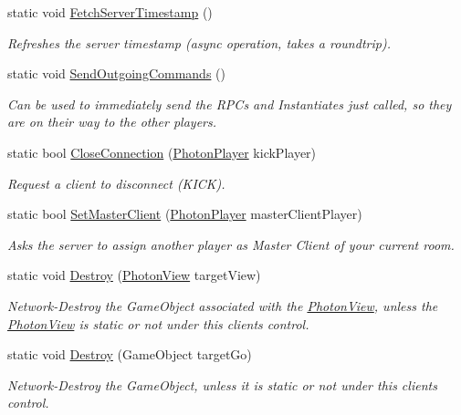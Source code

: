 \begin{DoxyCompactItemize}
static void \hyperlink{class_photon_network_a88ef2952a1d0a468d5ba2bff48fa084c}{Fetch\+Server\+Timestamp} ()
\begin{DoxyCompactList}\small\item\em Refreshes the server timestamp (async operation, takes a roundtrip). \end{DoxyCompactList}\item 
static void \hyperlink{class_photon_network_a3b8d0c1cefdf577e1dff8aecb147b7fd}{Send\+Outgoing\+Commands} ()
\begin{DoxyCompactList}\small\item\em Can be used to immediately send the R\+P\+Cs and Instantiates just called, so they are on their way to the other players. \end{DoxyCompactList}\item 
static bool \hyperlink{class_photon_network_a9cc8da229d513fce2fddbc5e2c6eaed2}{Close\+Connection} (\hyperlink{class_photon_player}{Photon\+Player} kick\+Player)
\begin{DoxyCompactList}\small\item\em Request a client to disconnect (K\+I\+CK). \end{DoxyCompactList}\item 
static bool \hyperlink{class_photon_network_a85b058bab4a369d0c5730cf43b462962}{Set\+Master\+Client} (\hyperlink{class_photon_player}{Photon\+Player} master\+Client\+Player)
\begin{DoxyCompactList}\small\item\em Asks the server to assign another player as Master Client of your current room. \end{DoxyCompactList}\item 
static void \hyperlink{class_photon_network_a52fdada993f0729be0912113c0ddb3f8}{Destroy} (\hyperlink{class_photon_view}{Photon\+View} target\+View)
\begin{DoxyCompactList}\small\item\em Network-\/\+Destroy the Game\+Object associated with the \hyperlink{class_photon_view}{Photon\+View}, unless the \hyperlink{class_photon_view}{Photon\+View} is static or not under this client\textquotesingle{}s control. \end{DoxyCompactList}\item 
static void \hyperlink{class_photon_network_abade51a8c3af0e9c280c2817f9ca15e5}{Destroy} (Game\+Object target\+Go)
\begin{DoxyCompactList}\small\item\em Network-\/\+Destroy the Game\+Object, unless it is static or not under this client\textquotesingle{}s control. \end{DoxyCompactList}\item 

\end{DoxyCompactItemize}
